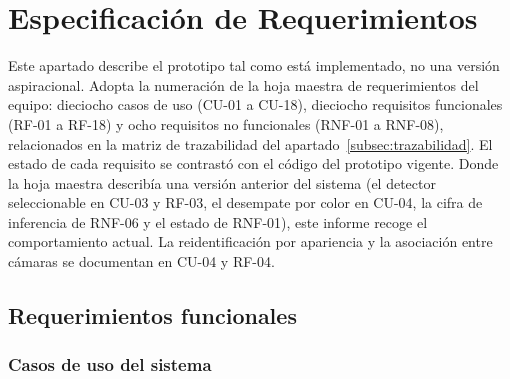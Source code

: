 \newcommand{\fichacu}[7]{%
  \subsubsection*{#1. #2}
  \noindent\textbf{Actor:} #3\par
  \noindent\textbf{Precondición:} #4\par
  \noindent\textbf{Flujo principal:}
  \begin{enumerate}[leftmargin=2.2em,itemsep=0.1em,topsep=0.2em]
  #5
  \end{enumerate}
  \noindent\textbf{Postcondición:} #6\par
  \if\relax\detokenize{#7}\relax\else\noindent\textbf{Excepción o nota:} #7\par\fi
  \medskip}

\section{Especificación de Requerimientos}
\label{sec:requerimientos}

Este apartado describe el prototipo tal como está implementado, no una versión aspiracional.
Adopta la numeración de la hoja maestra de requerimientos del equipo: dieciocho casos de uso
(CU-01 a CU-18), dieciocho requisitos funcionales (RF-01 a RF-18) y ocho requisitos no
funcionales (RNF-01 a RNF-08), relacionados en la matriz de trazabilidad del
apartado~\ref{subsec:trazabilidad}. El estado de cada requisito se contrastó con el código del
prototipo vigente. Donde la hoja maestra describía una versión anterior del sistema (el detector
seleccionable en CU-03 y RF-03, el desempate por color en CU-04, la cifra de inferencia de
RNF-06 y el estado de RNF-01), este informe recoge el comportamiento actual. La
reidentificación por apariencia y la asociación entre cámaras se documentan en CU-04 y RF-04.

\subsection{Requerimientos funcionales}
\label{subsec:rf}

\subsubsection{Casos de uso del sistema}
\label{subsec:casos-uso-tabla}

